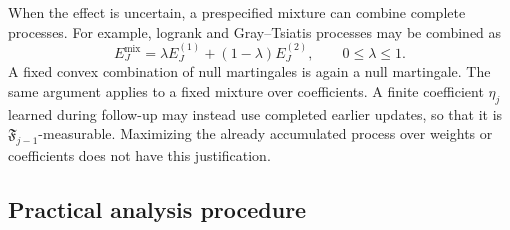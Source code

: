 \documentclass[12pt]{article}
\theoremstyle{definition}
\theoremstyle{remark}
\begin{document}
When the effect is uncertain, a prespecified mixture can combine complete processes. For example, logrank and Gray--Tsiatis processes may be combined as
\[
 E_J^{\mathrm{mix}}=\lambda E_J^{(1)}+(1-\lambda)E_J^{(2)},
 \qquad 0\leq\lambda\leq1.
\]
A fixed convex combination of null martingales is again a null martingale. The same argument applies to a fixed mixture over coefficients. A finite coefficient $\eta_j$ learned during follow-up may instead use completed earlier updates, so that it is $\mathfrak F_{j-1}$-measurable. Maximizing the already accumulated process over weights or coefficients does not have this justification.

\subsection{Practical analysis procedure}
\label{sec:practical-procedure}
\end{document}
